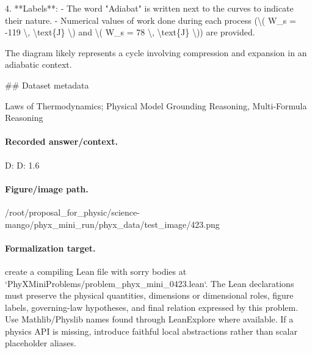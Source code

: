 4. **Labels**:
   - The word "Adiabat" is written next to the curves to indicate their nature.
   - Numerical values of work done during each process (\textbackslash{}( W\_s = -119 \textbackslash{}, \textbackslash{}text\{J\} \textbackslash{}) and \textbackslash{}( W\_s = 78 \textbackslash{}, \textbackslash{}text\{J\} \textbackslash{})) are provided.

The diagram likely represents a cycle involving compression and expansion in an adiabatic context.

\#\# Dataset metadata

Laws of Thermodynamics; Physical Model Grounding Reasoning, Multi-Formula Reasoning

\paragraph{Recorded answer/context.}
D: D: 1.6

\paragraph{Figure/image path.}
/root/proposal\_for\_physic/science-mango/phyx\_mini\_run/phyx\_data/test\_image/423.png

\paragraph{Formalization target.}
create a compiling Lean file with sorry bodies at `PhyXMiniProblems/problem\_phyx\_mini\_0423.lean`. The Lean declarations must preserve the physical quantities, dimensions or dimensional roles, figure labels, governing-law hypotheses, and final relation expressed by this problem.
Use Mathlib/Physlib names found through LeanExplore where available. If a physics API is missing, introduce faithful local abstractions rather than scalar placeholder aliases.

